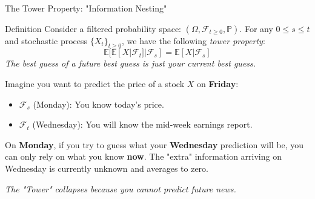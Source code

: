 \documentclass{beamer}
\begin{document}
\begin{frame}{The Tower Property: "Information Nesting"}

	\begin{block}{Definition}
		Consider a filtered probability space: $(\Omega, \mathcal{F}_{t\geq 0}, \mathbb{P})$.
		For any $0\leq s \leq t$ and stochastic process $\{X_t\}_{t\geq 0}$, we have the following \emph{tower property}:
		\begin{equation}
		\mathbb{E}[\mathbb{E}[X|\mathcal{F}_t]|\mathcal{F}_s]=\mathbb{E}[X|\mathcal{F}_s]
		\end{equation}
		\textit{The best guess of a future best guess is just your current best guess.}
	\end{block}

	\begin{tcolorbox}[colback=gray!5, colframe=maincolor, arc=0mm, boxrule=0.5pt]
		\footnotesize
			Imagine you want to predict the price of a stock $X$ on \textbf{Friday}:
		\begin{itemize}
			\item $\mathcal{F}_s$ (Monday): You know today's price.
			\item $\mathcal{F}_t$ (Wednesday): You will know the mid-week earnings report.
		\end{itemize}
		\vspace{0.2cm}
		On \textbf{Monday}, if you try to guess what your \textbf{Wednesday} prediction will be, you can only rely on what you know \textbf{now}. The "extra" information arriving on Wednesday is currently unknown and averages to zero.

		\centering
		\textit{The "Tower" collapses because you cannot predict future news.}
	\end{tcolorbox}
\end{frame}
\end{document}
